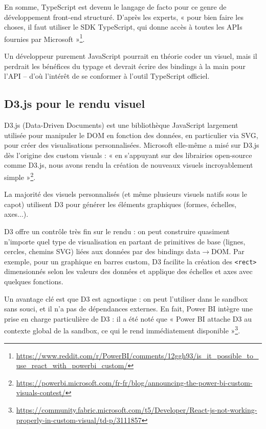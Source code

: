 En somme, TypeScript est devenu le langage de facto pour ce genre de développement front-end structuré. D’après les experts, « pour bien faire les choses, il faut utiliser le SDK TypeScript, qui donne accès à toutes les APIs fournies par Microsoft »\footnote{\url{https://www.reddit.com/r/PowerBI/comments/12ggh93/is_it_possible_to_use_react_with_powerbi_custom/}}.

Un développeur purement JavaScript pourrait en théorie coder un visuel, mais il perdrait les bénéfices du typage et devrait écrire des bindings à la main pour l’API – d’où l’intérêt de se conformer à l’outil TypeScript officiel.

\subsection{D3.js pour le rendu visuel}

D3.js (Data-Driven Documents) est une bibliothèque JavaScript largement utilisée pour manipuler le DOM en fonction des données, en particulier via SVG, pour créer des visualisations personnalisées. Microsoft elle-même a misé sur D3.js dès l’origine des custom visuals : « en s’appuyant sur des librairies open-source comme D3.js, nous avons rendu la création de nouveaux visuels incroyablement simple »\footnote{\url{https://powerbi.microsoft.com/fr-fr/blog/announcing-the-power-bi-custom-visuals-contest/}}.

La majorité des visuels personnalisés (et même plusieurs visuels natifs sous le capot) utilisent D3 pour générer les éléments graphiques (formes, échelles, axes...).

D3 offre un contrôle très fin sur le rendu : on peut construire quasiment n’importe quel type de visualisation en partant de primitives de base (lignes, cercles, chemins SVG) liées aux données par des bindings data$\rightarrow$DOM. Par exemple, pour un graphique en barres custom, D3 facilite la création des \texttt{<rect>} dimensionnés selon les valeurs des données et applique des échelles et axes avec quelques fonctions.

Un avantage clé est que D3 est agnostique : on peut l’utiliser dans le sandbox sans souci, et il n’a pas de dépendances externes. En fait, Power BI intègre une prise en charge particulière de D3 : il a été noté que « Power BI attache D3 au contexte global de la sandbox, ce qui le rend immédiatement disponible »\footnote{\url{https://community.fabric.microsoft.com/t5/Developer/React-js-not-working-properly-in-custom-visual/td-p/3111857}}.

